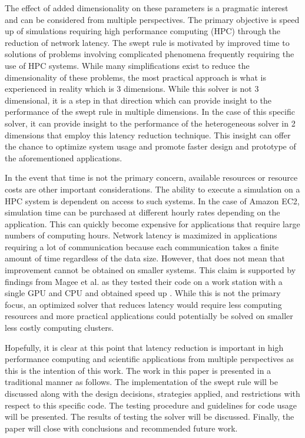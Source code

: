 \documentclass[review]{elsarticle}
\begin{document}
\par
The effect of added dimensionality on these parameters is a pragmatic interest and can be considered from multiple perspectives. The primary objective is speed up of simulations requiring high performance computing (HPC) through the reduction of network latency. The swept rule is motivated by improved time to solutions of problems involving complicated phenomena frequently requiring the use of HPC systems. While many simplifications exist to reduce the dimensionality of these problems, the most practical approach is what is experienced in reality which is 3 dimensions. While this solver is not 3 dimensional, it is a step in that direction which can provide insight to the performance of the swept rule in multiple dimensions. In the case of this specific solver, it can provide insight to the performance of the heterogeneous solver in 2 dimensions that employ this latency reduction technique. This insight can offer the chance to optimize system usage and promote faster design and prototype of the aforementioned applications.

\par
In the event that time is not the primary concern, available resources or resource costs are other important considerations. The ability to execute a simulation on a HPC system is dependent on access to such systems. In the case of Amazon EC2, simulation time can be purchased at different hourly rates depending on the application. This can quickly become expensive for applications that require large numbers of computing hours. Network latency is maximized in applications requiring a lot of communication because each communication takes a finite amount of time regardless of the data size. However, that does not mean that improvement cannot be obtained on smaller systems. This claim is supported by findings from Magee et al. as they tested their code on a work station with a single GPU and CPU and obtained speed up \cite{Magee2018AcceleratingDecomposition}. While this is not the primary focus, an optimized solver that reduces latency would require less computing resources and more practical applications could potentially be solved on smaller less costly computing clusters.

\par
Hopefully, it is clear at this point that latency reduction is important in high performance computing and scientific applications from multiple perspectives as this is the intention of this work. The work in this paper is presented in a traditional manner as follows. The implementation of the swept rule will be discussed along with the design decisions, strategies applied, and restrictions with respect to this specific code. The testing procedure and guidelines for code usage will be presented. The results of testing the solver will be discussed. Finally, the paper will close with conclusions and recommended future work.
\end{document}
